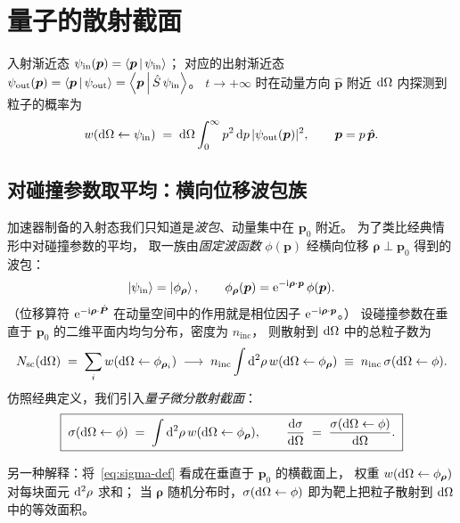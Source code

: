 \section{量子的散射截面}

入射渐近态 $\psi_{\text{in}}(\bm{p}) = \left\langle \bm{p} \,\middle|\, \psi_{\text{in}} \right\rangle$；
对应的出射渐近态 $\psi_{\text{out}}(\bm{p}) = \left\langle \bm{p} \,\middle|\, \psi_{\text{out}} \right\rangle = \left\langle \bm{p} \,\middle|\, \hat{S}\,\psi_{\text{in}} \right\rangle$。
$t\to+\infty$ 时在动量方向 $\hat{\bm{p}}$ 附近 $\mathrm{d}\Omega$ 内探测到粒子的概率为
\begin{equation}
w(\mathrm{d}\Omega \leftarrow \psi_{\text{in}}) \;=\; \mathrm{d}\Omega\int_0^\infty p^2\,\mathrm{d} p\,|\psi_{\text{out}}(\bm{p})|^2,
\qquad \bm{p} = p\,\hat{\bm{p}}.
\label{eq:w-dOmega}
\end{equation}

\subsection{对碰撞参数取平均：横向位移波包族}

加速器制备的入射态我们只知道是\emph{波包}、动量集中在 $\bm{p}_0$ 附近。
为了类比经典情形中对碰撞参数的平均，
取一族由\emph{固定波函数} $\phi(\bm{p})$ 经横向位移 $\bm{\rho}\perp\bm{p}_0$ 得到的波包：
\begin{equation}
\ket{\psi_{\text{in}}} = \ket{\phi_{\bm{\rho}}}, \qquad
\phi_{\bm{\rho}}(\bm{p}) = \mathrm{e}^{-\mathrm{i}\bm{\rho}\cdot\bm{p}}\,\phi(\bm{p}).
\label{eq:phi-rho}
\end{equation}
（位移算符 $\mathrm{e}^{-\mathrm{i}\bm{\rho}\cdot\hat{\bm{P}}}$ 在动量空间中的作用就是相位因子 $\mathrm{e}^{-\mathrm{i}\bm{\rho}\cdot\bm{p}}$。）
设碰撞参数在垂直于 $\bm{p}_0$ 的二维平面内均匀分布，密度为 $n_{\text{inc}}$，
则散射到 $\mathrm{d}\Omega$ 中的总粒子数为
\begin{equation}
N_{\text{sc}}(\mathrm{d}\Omega) \;=\; \sum_i w(\mathrm{d}\Omega \leftarrow \phi_{\bm{\rho}_i})
\;\longrightarrow\; n_{\text{inc}}\int \mathrm{d}^2\rho\, w(\mathrm{d}\Omega \leftarrow \phi_{\bm{\rho}})
\;\equiv\; n_{\text{inc}}\,\sigma(\mathrm{d}\Omega \leftarrow \phi).
\end{equation}
仿照经典定义，我们引入\emph{量子微分散射截面}：
\begin{equation}
\boxed{\;\sigma(\mathrm{d}\Omega \leftarrow \phi) \;=\; \int \mathrm{d}^2\rho\,w(\mathrm{d}\Omega \leftarrow \phi_{\bm{\rho}}),\qquad
\frac{\mathrm{d}\sigma}{\mathrm{d}\Omega} \;=\; \frac{\sigma(\mathrm{d}\Omega \leftarrow \phi)}{\mathrm{d}\Omega}.\;}
\label{eq:sigma-def}
\end{equation}

\begin{remark}
另一种解释：将~\eqref{eq:sigma-def} 看成在垂直于 $\bm{p}_0$ 的横截面上，
权重 $w(\mathrm{d}\Omega\leftarrow\phi_{\bm{\rho}})$ 对每块面元 $\mathrm{d}^2\rho$ 求和；
当 $\bm{\rho}$ 随机分布时，$\sigma(\mathrm{d}\Omega\leftarrow\phi)$ 即为靶上把粒子散射到 $\mathrm{d}\Omega$ 中的等效面积。
\end{remark}

